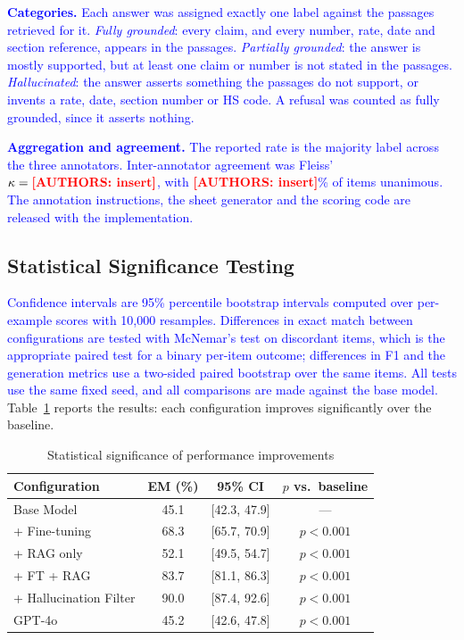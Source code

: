 \documentclass{article}
\newcommand{\revised}[1]{\textcolor{blue}{#1}}
\newcommand{\needsnum}[1]{\textcolor{red}{\textbf{[#1]}}}
\newcommand{\revised}[1]{#1}
\newcommand{\needsnum}[1]{#1}
\begin{document}
\revised{\textbf{Categories.} Each answer was assigned exactly one label against the
passages retrieved for it. \emph{Fully grounded}: every claim, and every number, rate,
date and section reference, appears in the passages. \emph{Partially grounded}: the
answer is mostly supported, but at least one claim or number is not stated in the
passages. \emph{Hallucinated}: the answer asserts something the passages do not support,
or invents a rate, date, section number or HS code. A refusal was counted as fully
grounded, since it asserts nothing.}

\revised{\textbf{Aggregation and agreement.} The reported rate is the majority label
across the three annotators. Inter-annotator agreement was Fleiss'
$\kappa = \needsnum{AUTHORS: insert}$, with \needsnum{AUTHORS: insert}\% of items
unanimous. The annotation instructions, the sheet generator and the scoring code are
released with the implementation.}

\subsection{Statistical Significance Testing}

\revised{Confidence intervals are 95\% percentile bootstrap intervals computed over
per-example scores with 10,000 resamples. Differences in exact match between
configurations are tested with McNemar's test on discordant items, which is the
appropriate paired test for a binary per-item outcome; differences in F1 and the
generation metrics use a two-sided paired bootstrap over the same items. All tests use
the same fixed seed, and all comparisons are made against the base model.}
Table~\ref{tab:statistical} reports the results: each configuration improves
significantly over the baseline.

\begin{table}[!h]
\caption{Statistical significance of performance improvements}
\centering
\begin{tabular}{lccc}
\hline
\textbf{Configuration} & \textbf{EM (\%)} & \textbf{95\% CI} & \textbf{$p$ vs.\ baseline} \\
\hline
Base Model & 45.1 & [42.3, 47.9] & --- \\
+ Fine-tuning & 68.3 & [65.7, 70.9] & $p < 0.001$ \\
+ RAG only & 52.1 & [49.5, 54.7] & $p < 0.001$ \\
+ FT + RAG & 83.7 & [81.1, 86.3] & $p < 0.001$ \\
+ Hallucination Filter & 90.0 & [87.4, 92.6] & $p < 0.001$ \\
GPT-4o & 45.2 & [42.6, 47.8] & $p < 0.001$ \\
\hline
\end{tabular}
\label{tab:statistical}
\end{table}
\end{document}

